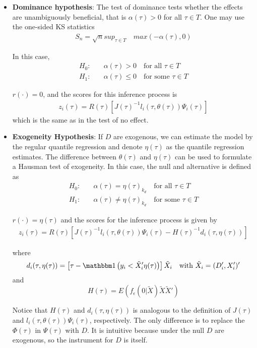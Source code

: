\begin{itemize}
  \item {\bf Dominance hypothesis}:
    The test of dominance tests whether the effects are unambiguously
    beneficial, that is $\alpha(\tau) > 0$ for all $\tau \in T$. One may use the
    one-sided KS statistics
    \begin{align*}
      S_n= \sqrt{n} sup_{\tau \in T} \quad max(-\alpha(\tau), 0)
    \end{align*}

    In this case, 
    \begin{align*}
      H_0: &\quad	\alpha(\tau) >0 \quad \text{for all $\tau \in T$}
      \\
      H_1: &\quad	\alpha(\tau) \leq 0 \quad \text{for some $\tau \in
      T$}
    \end{align*}

    $r(\cdot) = 0$, and the scores for this inference process is
	\begin{align*}
      z_i(\tau) = R(\tau) [ J(\tau)^{-1} l_i(\tau, \theta(\tau)) \Psi_i(\tau)]
	\end{align*}
   which is the same as in the test of no effect.

 \item {\bf Exogeneity Hypothesis}: 
   If $D$ are exogenous, we can estimate the model by the regular quantile
   regression and denote $\eta(\tau)$ as the quantile regression estimates. The
   difference between $\theta(\tau)$ and $\eta(\tau)$ can be used to formulate a
   Hausman test of exogeneity. In this case, the null and alternative is defined
   as
   \begin{align*}
     H_0: &\quad	\alpha(\tau) = \eta(\tau)_{k_d} \quad \text{for all
     $\tau \in T$} \\
      H_1: &\quad	\alpha(\tau) \neq \eta(\tau)_{k_d} \quad \text{for some
	$\tau \in T$}
   \end{align*}

   $r(\cdot) = \eta(\tau)$ 
   and the scores for
   the inference process is given by
   \begin{align*}
      z_i(\tau) = R(\tau) \left[ 
      J(\tau)^{-1} l_i(\tau, \theta(\tau)) \Psi_i(\tau)
      - H(\tau)^{-1} d_i(\tau, \eta(\tau))
    \right]
   \end{align*}

   where $$
   d_i(\tau, \eta(\tau)) = \left[
   \tau -  \I\left(y_i < \tilde{X}_i'\eta(\tau)\right)
 \right] \tilde{X}_i
 \quad \text{with  } \tilde{X}_i = (D_i', X_i')'
   $$ and
   $$
   	H(\tau) = E(f_\epsilon(0|\tilde{X})\tilde{X} \tilde{X}')
   $$

   Notice that $H(\tau)$ and $d_i(\tau, \eta(\tau))$ is analogous to the
   definition of $J(\tau)$ and $l_i(\tau, \theta(\tau))\Psi_i(\tau)$,
   respectively. The only difference is to replace the $\Phi(\tau)$ in
   $\Psi(\tau)$ with $D$. It is intuitive because under the null $D$ are
   exogenous, so the instrument for $D$ is itself.

\end{itemize}

